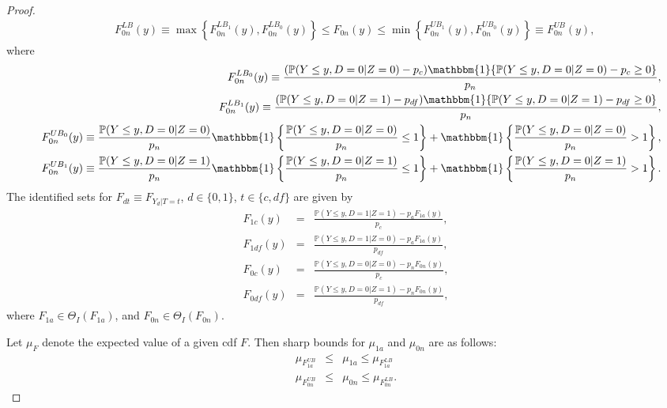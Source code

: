 \documentclass[12pt]{article}
\theoremstyle{plain}
\theoremstyle{definition}
\theoremstyle{remark}
\begin{document}
\begin{proof}
\begin{eqnarray}
   &&F_{0n}^{LB}(y)\equiv \max\left\{F_{0n}^{LB_1}(y),F_{0n}^{LB_0}(y)\right\} \leq F_{0n}(y) \leq \min\left\{F_{0n}^{UB_1}(y),F_{0n}^{UB_0}(y)\right\}\equiv F_{0n}^{UB}(y),
\end{eqnarray}
where
\begin{eqnarray*}
    && F_{0n}^{LB_0}(y) \equiv \frac{(\mathbb P(Y\leq y, D=0 \vert Z=0)- p_c)\mathbbm{1}\{\mathbb P(Y \leq y, D=0 \vert Z=0)- p_c\geq 0\}}{p_n},\\
   && F_{0n}^{LB_1}(y) \equiv \frac{(\mathbb P(Y\leq y, D=0 \vert Z=1)- p_{df})\mathbbm{1}\{\mathbb P(Y\leq y, D=0 \vert Z=1)- p_{df}\geq 0\}}{p_n},\\
   && F_{0n}^{UB_0}(y) \equiv \frac{\mathbb P(Y \leq y, D=0 \vert Z=0)}{p_n}\mathbbm{1}\left\{\frac{\mathbb P(Y \leq y, D=0 \vert Z=0)}{p_n} \leq 1\right\} + \mathbbm{1}\left\{\frac{\mathbb P(Y \leq y, D=0 \vert Z=0)}{p_n} > 1\right\},\\
   && F_{0n}^{UB_1}(y) \equiv \frac{\mathbb P(Y \leq y, D=0 \vert Z=1)}{p_n}\mathbbm{1}\left\{\frac{\mathbb P(Y\leq y, D=0 \vert Z=1)}{p_n} \leq 1\right\} + \mathbbm{1}\left\{\frac{\mathbb P(Y\leq y, D=0 \vert Z=1)}{p_n} > 1\right\}.
    \end{eqnarray*}
The identified sets for $F_{dt}\equiv F_{Y_d\vert T=t}$, $d\in\{0,1\}$, $t\in \{c,df\}$ are given by
  \begin{eqnarray*}
      F_{1c}(y) &=& \frac{\mathbb P(Y \leq y, D=1 \vert Z=1)-p_a F_{1a}(y)}{p_c },\\
    F_{1df}(y) &=& \frac{\mathbb P(Y \leq y, D=1 \vert Z=0)-p_a F_{1a}(y)}{p_{df} },\\
    F_{0c}(y) &=& \frac{\mathbb P(Y \leq y, D=0 \vert Z=0)-p_n F_{0n}(y)}{p_c },\\
    F_{0df}(y) &=& \frac{\mathbb P(Y \leq y, D=0 \vert Z=1)-p_n F_{0n}(y)}{p_{df}},
  \end{eqnarray*}  
where $F_{1a} \in \Theta_I(F_{1a})$, and $F_{0n} \in \Theta_I(F_{0n})$. 

Let $\mu_{F}$ denote the expected value of a given cdf $F$. Then sharp bounds for $\mu_{1a}$ and $\mu_{0n}$ are as follows: 
\begin{eqnarray*}
    \mu_{F_{1a}^{UB}} &\leq& \mu_{1a} \leq \mu_{F_{1a}^{LB}}\\
    \mu_{F_{0n}^{UB}} &\leq& \mu_{0n} \leq \mu_{F_{0n}^{LB}}.
\end{eqnarray*}


\end{proof}
\end{document}
